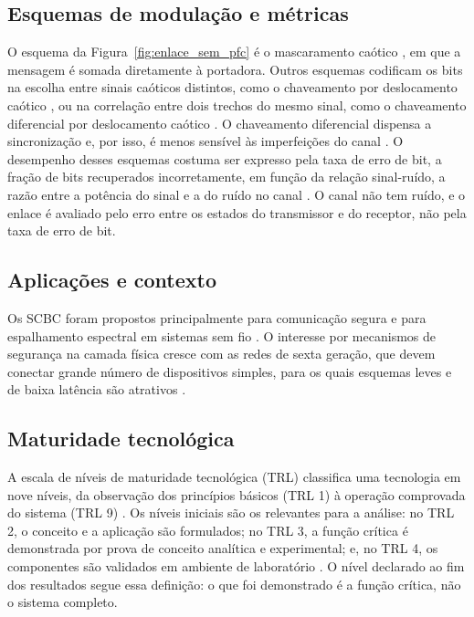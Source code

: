 \documentclass{pfccefsa}
\begin{document}
\subsection{Esquemas de modulação e métricas}
\label{sub:modulacao}

O esquema da Figura~\ref{fig:enlace_sem_pfc} é o mascaramento caótico \cite{Cuomo1993}, em que a
mensagem é somada diretamente à portadora. Outros esquemas codificam os bits na escolha entre sinais caóticos distintos,
como o chaveamento por deslocamento caótico \cite{Dedieu1993}, ou na correlação entre dois trechos
do mesmo sinal, como o chaveamento diferencial por deslocamento caótico
\cite{Kolumban1996DCSK}. O chaveamento diferencial dispensa a sincronização e,
por isso, é menos sensível às imperfeições do canal \cite{Kolumban1996DCSK,Kaddoum2016}. O desempenho desses
esquemas costuma ser expresso pela taxa de erro de bit, a fração de bits
recuperados incorretamente, em função da relação sinal-ruído, a razão
entre a potência do sinal e a do ruído no canal \cite{Kaddoum2016}. O canal não tem ruído, e o enlace é avaliado pelo erro entre os estados do
transmissor e do receptor, não pela taxa de erro de bit.

\subsection{Aplicações e contexto}

Os SCBC foram propostos principalmente para comunicação segura e para
espalhamento espectral em sistemas sem fio \cite{Kaddoum2016,Baptista2021}. O
interesse por mecanismos de segurança na camada física cresce com as redes de
sexta geração, que devem conectar grande número de dispositivos simples, para
os quais esquemas leves e de baixa latência são atrativos \cite{Chorti2022}.

\subsection{Maturidade tecnológica}

A escala de níveis de maturidade tecnológica (TRL) classifica uma tecnologia
em nove níveis, da observação dos princípios básicos (TRL 1) à operação
comprovada do sistema (TRL 9) \cite{Mankins1995}. Os níveis iniciais são os
relevantes para a análise: no TRL 2, o conceito e a aplicação são
formulados; no TRL 3, a função crítica é demonstrada por prova de conceito
analítica e experimental; e, no TRL 4, os componentes são validados em ambiente
de laboratório \cite{Mankins1995}. O nível declarado ao fim dos resultados segue
essa definição: o que foi demonstrado é a função crítica, não o sistema completo.
\end{document}
